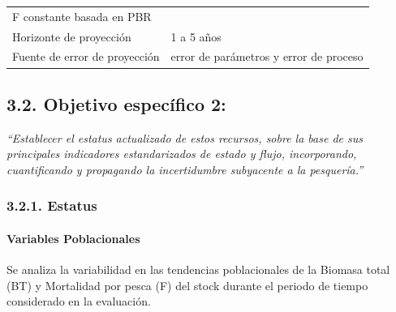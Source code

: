 \documentclass[
  spanish,
]{article}
\begin{document}
\begin{longtable}[]{@{}ll@{}}
\begin{minipage}[t]{0.64\columnwidth}
F constante basada en PBR\strut
\end{minipage}\tabularnewline
\begin{minipage}[t]{0.30\columnwidth}\raggedright
Horizonte de proyección\strut
\end{minipage} & \begin{minipage}[t]{0.64\columnwidth}\raggedright
1 a 5 años\strut
\end{minipage}\tabularnewline
\begin{minipage}[t]{0.30\columnwidth}\raggedright
Fuente de error de proyección\strut
\end{minipage} & \begin{minipage}[t]{0.64\columnwidth}\raggedright
error de parámetros y error de proceso\strut
\end{minipage}\tabularnewline
\bottomrule
\end{longtable}

\pagebreak

\hypertarget{objetivo-especuxedfico-2}{%
\subsection{3.2. Objetivo específico
2:}\label{objetivo-especuxedfico-2}}

\vspace{-0.2cm}

\emph{``Establecer el estatus actualizado de estos recursos, sobre la
base de sus principales indicadores estandarizados de estado y flujo,
incorporando, cuantificando y propagando la incertidumbre subyacente a
la pesquería.''} \vspace{0.5cm}

\hypertarget{estatus}{%
\subsubsection{3.2.1. Estatus}\label{estatus}}

\vspace{0.8cm}

\hypertarget{variables-poblacionales}{%
\paragraph{Variables Poblacionales}\label{variables-poblacionales}}

\quad

Se analiza la variabilidad en las tendencias poblacionales de la Biomasa
total (BT) y Mortalidad por pesca (F) del stock durante el periodo de
tiempo considerado en la evaluación.
\end{document}
